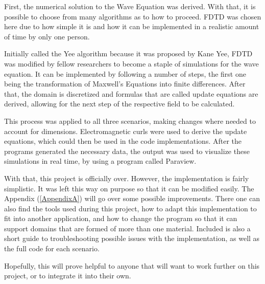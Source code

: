 First, the numerical solution to the Wave Equation was derived. With that, it is possible to choose from many algorithms as to how to proceed. FDTD was chosen here due to how simple it is and how it can be implemented in a realistic amount of time by only one person\textsuperscript{\cite{davidson2010computational}}. 

Initially called the Yee algorithm because it was proposed by Kane Yee, FDTD was modified by fellow researchers to become a staple of simulations for the wave equation. It can be implemented by following a number of steps, the first one being the transformation of Maxwell's Equations into finite differences. After that, the domain is discretized and formulas that are called update equations are derived, allowing for the next step of the respective field to be calculated.

This process was applied to all three scenarios, making changes where needed to account for dimensions. Electromagnetic curls were used to derive the update equations, which could then be used in the code implementations. After the programs generated the necessary data, the output was used to visualize these simulations in real time, by using a program called Paraview\textsuperscript{\cite{paraview}}.

With that, this project is officially over. However, the implementation is fairly simplistic. It was left this way on purpose so that it can be modified easily. The Appendix (\ref{AppendixA}) will go over some possible improvements. There one can also find the tools used during this project, how to adapt this implementation to fit into another application, and how to change the program so that it can support domains that are formed of more than one material. Included is also a short guide to troubleshooting possible issues with the implementation, as well as the full code for each scenario.

Hopefully, this will prove helpful to anyone that will want to work further on this project, or to integrate it into their own.